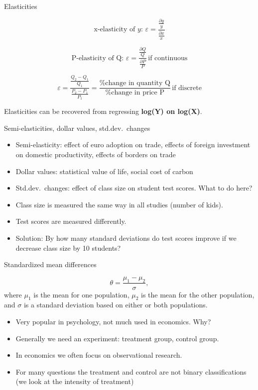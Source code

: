 \documentclass{beamer} %
\begin{document}
\begin{frame}{Elasticities}

\[
\text{x-elasticity of } y: \, \varepsilon = \frac{\frac{\partial y}{y}}{\frac{\partial x}{x}}
\]

\[
\text{P-elasticity of Q: } \varepsilon = \frac{\frac{\partial Q}{Q}}{\frac{\partial P}{P}} \, \text{if continuous}
\]

\[
\varepsilon = \frac{\frac{Q_2 - Q_1}{Q_1}}{\frac{P_2 - P_1}{P_1}} = \frac{\text{\% change in quantity Q}}{\text{\% change in price P}} \, \text{if discrete}
\]

Elasticities can be recovered from regressing \textbf{log(Y) on log(X)}.


\end{frame}


\begin{frame}{Semi-elasticities, dollar values, std.dev.\ changes}
\begin{itemize}
	\item Semi-elasticity: effect of euro adoption on trade, effects of foreign investment on domestic productivity, effects of borders on trade
	\item Dollar values: statistical value of life, social cost of carbon
	\item Std.dev.\ changes: effect of class size on student test scores. What to do here?
	\item Class size is measured the same way in all studies (number of kids).
	\item Test scores are measured differently.
	\item Solution: By how many standard deviations do test scores improve if we decrease class size by 10 students?
\end{itemize}
\end{frame}


\begin{frame}{Standardized mean differences}

\[
\theta = \frac{\mu_1 - \mu_2}{\sigma},
\]
where $\mu_1$ is the mean for one population, $\mu_2$ is the mean for the other population, and $\sigma$ is a standard deviation based on either or both populations.

\bigskip
\begin{itemize}
	\item Very popular in psychology, not much used in economics. Why?
	\item Generally we need an experiment: treatment group, control group.
	\item In economics we often focus on observational research.
	\item For many questions the treatment and control are not binary classifications (we look at the intensity of treatment)
\end{itemize}


\end{frame}
\end{document}
